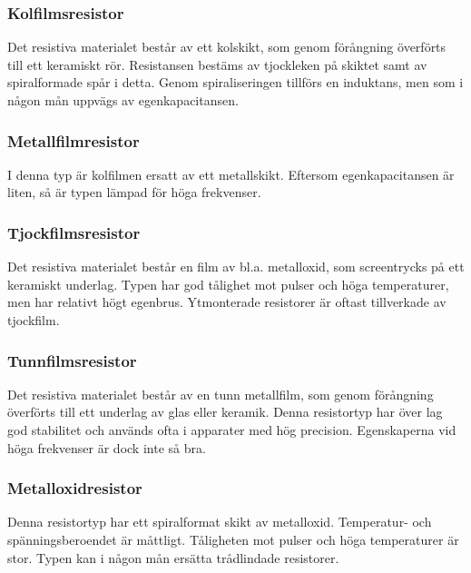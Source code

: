 \subsubsection{Kolfilmsresistor}

Det resistiva materialet består av ett kolskikt, som genom förångning överförts
till ett keramiskt rör. Resistansen bestäms av tjockleken på skiktet samt av
spiralformade spår i detta. Genom spiraliseringen tillförs en induktans, men
som i någon mån uppvägs av egenkapacitansen.

\subsubsection{Metallfilmresistor}

I denna typ är kolfilmen ersatt av ett metallskikt. Eftersom egenkapacitansen
är liten, så är typen lämpad för höga frekvenser.

\subsubsection{Tjockfilmsresistor}

Det resistiva materialet består en film av bl.a. metalloxid, som screentrycks
på ett keramiskt underlag. Typen har god tålighet mot pulser och höga
temperaturer, men har relativt högt egenbrus. Ytmonterade resistorer är oftast
tillverkade av tjockfilm.

\subsubsection{Tunnfilmsresistor}

Det resistiva materialet består av en tunn metallfilm, som genom förångning
överförts till ett underlag av glas eller keramik. Denna resistortyp har över
lag god stabilitet och används ofta i apparater med hög precision. Egenskaperna
vid höga frekvenser är dock inte så bra.

\subsubsection{Metalloxidresistor}

Denna resistortyp har ett spiralformat skikt av metalloxid. Temperatur- och
spänningsberoendet är måttligt. Tåligheten mot pulser och höga temperaturer är
stor. Typen kan i någon mån ersätta trådlindade resistorer.


